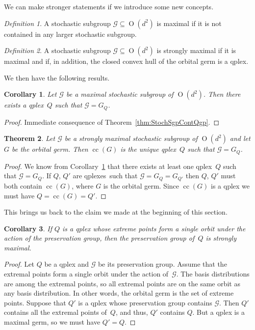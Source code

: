 \documentclass[aps,pra,superscriptaddress,10pt,tightenlines,twocolumn,nofootinbib]{revtex4}
\newtheorem{theorem}{Theorem}
\newtheorem{corollary}[theorem]{Corollary}
\theoremstyle{remark}
\newtheorem{definition}{Definition}
\newcommand{\qp}{Q}
\newcommand{\pr}{G}
\newcommand{\gp}{\mathcal{G}}
\newcommand{\qplex}{qplex}
\newcommand{\qplexes}{qplexes}
\newcommand{\qgp}[1]{G_{#1}}
\DeclareMathOperator{\Ot}{O}
\DeclareMathOperator{\cc}{cc}
\begin{document}
We can make  stronger statements if we introduce some new concepts.
\begin{definition}
A stochastic subgroup $\gp\subseteq \Ot(d^2)$ is maximal if it is not contained in any larger stochastic subgroup.
\end{definition}
\begin{definition}
A stochastic subgroup $\gp\subseteq \Ot(d^2)$ is strongly maximal if it is maximal and if, in addition, the closed convex hull of the orbital germ is a \qplex.
\end{definition}
We then have the following results.
\begin{corollary}
\label{cor:maxStochQplex}
Let $\gp$ be a maximal stochastic subgroup of $\Ot(d^2)$.  Then there exists a \qplex\ $\qp$ such that $\gp=\qgp{\qp}$.
\end{corollary}
\begin{proof}
Immediate consequence of Theorem~\ref{thm:StochSgpContQgp}.
\end{proof}
\begin{theorem}
Let $\gp$ be a strongly maximal stochastic subgroup of $\Ot(d^2)$ and let $\pr$ be the orbital germ.  Then $\cc(\pr)$ is the unique \qplex\ $\qp$ such that $\gp=\qgp{\qp}$.
\end{theorem}
\begin{proof}
We know from Corollary~\ref{cor:maxStochQplex} that there exists at least one \qplex\ $\qp$ such that $\gp=\qgp{\qp}$.  If $\qp$, $\qp'$ are \qplexes\ such that $\gp=\qgp{\qp} = \qgp{\qp'}$ then $\qp$, $\qp'$ must both contain $\cc(\pr)$, where $\pr$ is the orbital germ.  Since $\cc(\pr)$ is a qplex we must have $\qp = \cc(\pr) = \qp'$.
\end{proof}

This brings us back to the claim we made at the beginning of this section.

\begin{corollary}
If $\qp$ is a qplex whose extreme points form a single orbit under the action of the preservation group, then the preservation group of~$\qp$ is strongly maximal.
\end{corollary}
\begin{proof}
Let $\qp$ be a qplex and $\gp$ be its preservation group.  Assume that the extremal points form a single orbit under the action of~$\gp$.  The basis distributions are among the extremal points, so all extremal points are on the same orbit as any basis distribution.  In other words, the orbital germ is the set of extreme points.  Suppose that $\qp'$ is a qplex whose preservation group contains $\gp$.  Then $\qp'$ contains all the extremal points of~$\qp$, and thus, $\qp'$ contains $\qp$.  But a qplex is a maximal germ, so we must have $\qp' = \qp$.
\end{proof}
\end{document}

